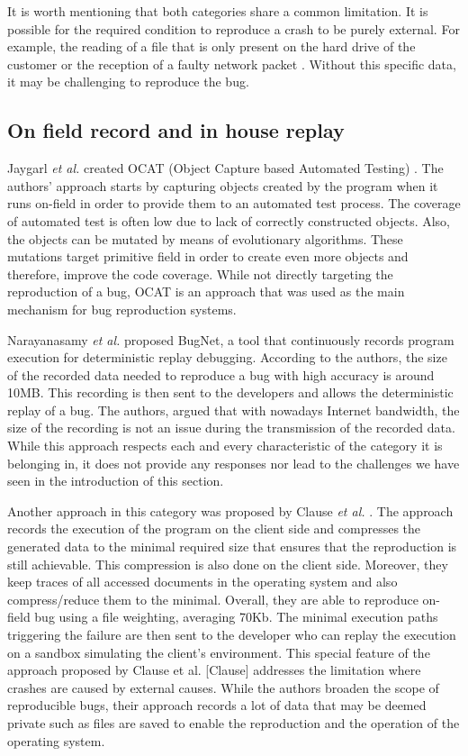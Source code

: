 \documentclass[times]{smrauth}
\begin{document}
It is worth mentioning that both categories share a common limitation. It is possible for the required condition to reproduce a crash to be purely external. For example, the reading of a file that is only present on the hard drive of the customer or the reception of a faulty network packet \cite{Chen2013a, Nayrolles2015}. Without this specific data, it may be challenging to reproduce the bug.



\subsection{On field record and in house replay}

Jaygarl {\it et al.} created OCAT (Object Capture based Automated Testing) \cite{Jaygarl}. The authors' approach starts by capturing objects created by the program when it runs on-field in order to provide them to an automated test process. The coverage of automated test is often low due to lack of correctly constructed objects. Also, the objects can be mutated by means of evolutionary algorithms. These mutations target primitive field in order to create even more objects and therefore, improve the code coverage. While not directly targeting the reproduction of a bug, OCAT is an approach that was used as the main mechanism for bug reproduction systems.

Narayanasamy {\it et al.} \cite{Narayanasamy2005} proposed BugNet, a tool that continuously records program execution for deterministic replay debugging. According to the authors, the size of the recorded data needed to reproduce a bug with high accuracy is around 10MB. This recording is then sent to the developers and allows the deterministic replay of a bug. The authors, argued that with nowadays Internet bandwidth, the size of the recording is not an issue during the transmission of the recorded data. While this approach respects each and every characteristic of the category it is belonging in, it does not provide any responses nor lead to the challenges we have seen in the introduction of this section.

Another approach in this category was  proposed by Clause {\it et al.} \cite{Clause2007}. The approach records the execution of the program on the client side and compresses the generated data to the minimal required size that ensures that the reproduction is still achievable. This compression is also done on the client side. Moreover, they keep traces of all accessed documents in the operating system and also compress/reduce them to the minimal. Overall, they are able to reproduce on-field bug using a file weighting, averaging 70Kb. The minimal execution paths triggering the failure are then sent to the developer who can replay the execution on a sandbox simulating the client's environment.
This special feature of the approach proposed by Clause et al. [Clause] addresses the limitation where crashes are caused by external causes. While the authors broaden the scope of reproducible bugs, their approach records a lot of data that may be deemed private such as files are saved to enable the reproduction and the operation of the operating system.
\end{document}
